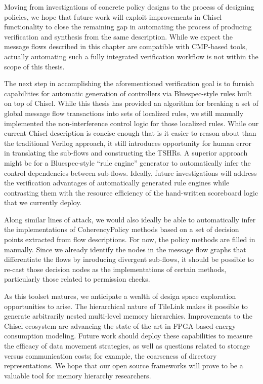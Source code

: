 Moving from investigations of concrete policy designs to the process of designing policies,
we hope that future work will exploit improvements in Chisel functionality to close the remaining gap in
automating the process of producing verification and synthesis from the same description.
While we expect the message flows described in this chapter are compatible with CMP-based tools,
actually automating such a fully integrated verification workflow is not within the scope of this thesis.

The next step in accomplishing the aforementioned verification goal is to furnish capabilities for
automatic generation of controllers via Bluespec-style rules built on top of Chisel.
While this thesis has provided an algorithm for  breaking a set of
global message flow transactions into sets of localized rules,
we still manually implemented the non-interference control logic for those localized rules.
While our current Chisel description is concise enough that is it easier to reason about than the traditional Verilog approach,
it still introduces opportunity for human error in translating the sub-flows and constructing the TSHRs.
A superior approach might be for a Bluespec-style ``rule engine'' generator to automatically infer the control dependencies between sub-flows.
Ideally, future investigations will address the verification advantages of automatically generated rule engines while
contrasting them with the resource efficiency of the hand-written scoreboard logic that we currently deploy.

Along similar lines of attack, we would also ideally be able to automatically infer the implementations of CoherencyPolicy methods
based on a set of decision points extracted from flow descriptions.
For now, the policy methods are filled in manually.
Since we already identify the nodes in the message flow graphs that differentiate the flows by
inroducing divergent sub-flows, it should be possible to re-cast those decision nodes as the implementations of certain methods,
particularly those related to permission checks.

As this toolset matures, we anticipate a wealth of design space exploration opportunities to arise.
The hierarchical nature of TileLink makes it possible to generate arbitrarily nested multi-level memory hierarchies.
Improvements to the Chisel ecosystem are advancing the state of the art in FPGA-based energy consumption modeling.
Future work should deploy these capabilities to measure the efficacy of data movement strategies,
as well as questions related to storage versus communication costs; for example, the coarseness of directory representations.
We hope that our open source frameworks will prove to be a valuable tool for memory hierarchy researchers.

